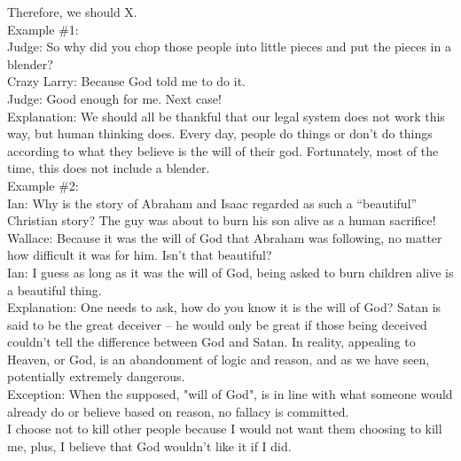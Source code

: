 \documentclass[a4paper,12pt,single,pdftex]{scrbook}
\begin{document}
    
      Therefore, we should X.
    \\

    
      Example \#1:
    \\

    
      Judge: So why did you chop those people into little pieces and put the pieces in a blender?
    \\

    
      Crazy Larry: Because God told me to do it.
    \\

    
      Judge: Good enough for me.  Next case!
    \\

    
      Explanation: We should all be thankful that our legal system does not work this way, but human thinking does.  Every day, people do things or don’t do things according to what they believe is the will of their god.  Fortunately, most of the time, this does not include a blender.
    \\

    
      Example \#2:
    \\

    
      Ian: Why is the story of Abraham and Isaac regarded as such a “beautiful” Christian story?  The guy was about to burn his son alive as a human sacrifice!
    \\

    
      Wallace: Because it was the will of God that Abraham was following, no matter how difficult it was for him.  Isn’t that beautiful?
    \\

    
      Ian: I guess as long as it was the will of God, being asked to burn children alive is a beautiful thing.
    \\

    
      Explanation: One needs to ask, how do you know it is the will of God?  Satan is said to be the great deceiver -- he would only be great if those being deceived couldn’t tell the difference between God and Satan.  In reality, appealing to Heaven, or God, is an abandonment of logic and reason, and as we have seen, potentially extremely dangerous.
    \\

    
      Exception: When the supposed, "will of God", is in line with what someone would already do or believe based on reason, no fallacy is committed.
    \\

    
      I choose not to kill other people because I would not want them choosing to kill me, plus, I believe that God wouldn’t like it if I did.
    \\
\end{document}
